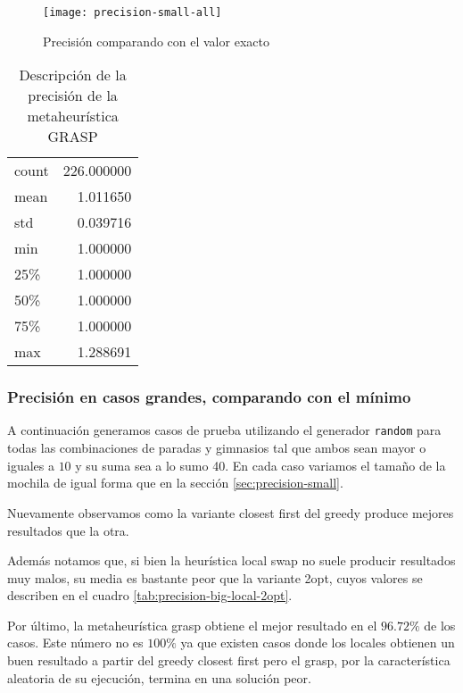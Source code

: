 \begin{figure}[H]
    \centering
    \texttt{[image: precision-small-all]}
    \caption{Precisión comparando con el valor exacto}
    \label{fig:precision-small-all}
\end{figure}

\begin{table}[H]
    \begin{center}
        \begin{tabular}{ l | r }
            count  & 226.000000 \\
            mean   &   1.011650 \\
            std    &   0.039716 \\
            min    &   1.000000 \\
            25\%   &   1.000000 \\
            50\%   &   1.000000 \\
            75\%   &   1.000000 \\
            max    &   1.288691 \\
        \end{tabular}
        \caption{Descripción de la precisión de la metaheurística GRASP}\label{tab:precision-small-grasp}
    \end{center}
\end{table}

\subsubsection{Precisión en casos grandes, comparando con el mínimo}
\label{sec:precision-big}

A continuación generamos casos de prueba utilizando el generador \texttt{random} para todas las combinaciones de paradas y gimnasios tal que ambos
sean mayor o iguales a $10$ y su suma sea a lo sumo 40.
En cada caso variamos el tamaño de la mochila de igual forma que en la sección \ref{sec:precision-small}.

Nuevamente observamos como la variante closest first del greedy produce mejores resultados que la otra.

Además notamos que, si bien la heurística local swap no suele producir resultados muy malos,
su media es bastante peor que la variante 2opt, cuyos valores se describen en el cuadro \ref{tab:precision-big-local-2opt}.

Por último, la metaheurística grasp obtiene el mejor resultado en el $96.72\%$ de los casos.
Este número no es $100\%$ ya que existen casos donde los locales obtienen un buen resultado a partir del greedy closest first
pero el grasp, por la característica aleatoria de su ejecución, termina en una solución peor.

